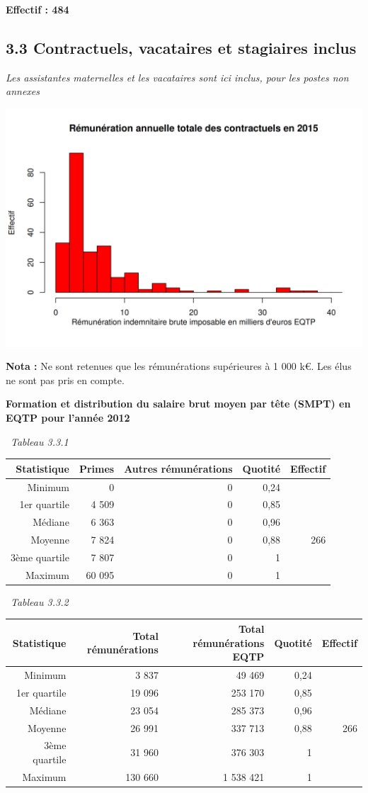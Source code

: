 \textbf{Effectif : 484 }

\hypertarget{contractuels-vacataires-et-stagiaires-inclus-1}{%
\subsection{3.3 Contractuels, vacataires et stagiaires
inclus}\label{contractuels-vacataires-et-stagiaires-inclus-1}}

\emph{Les assistantes maternelles et les vacataires sont ici inclus,
pour les postes non annexes}

\includegraphics{altair_files/figure-latex/unnamed-chunk-94-1.png}

\textbf{Nota :} Ne sont retenues que les rémunérations supérieures à 1
000 k€. Les élus ne sont pas pris en compte.

\textbf{Formation et distribution du salaire brut moyen par tête (SMPT)
en EQTP pour l'année 2012 }

~\emph{Tableau 3.3.1}

\begin{longtable}[]{@{}rrrrr@{}}
\toprule
Statistique & Primes & Autres rémunérations & Quotité &
Effectif\tabularnewline
\midrule
\endhead
Minimum & 0 & 0 & 0,24 &\tabularnewline
1er quartile & 4 509 & 0 & 0,85 &\tabularnewline
Médiane & 6 363 & 0 & 0,96 &\tabularnewline
Moyenne & 7 824 & 0 & 0,88 & 266\tabularnewline
3ème quartile & 7 807 & 0 & 1 &\tabularnewline
Maximum & 60 095 & 0 & 1 &\tabularnewline
\bottomrule
\end{longtable}

~\emph{Tableau 3.3.2}

\begin{longtable}[]{@{}rrrrr@{}}
\toprule
Statistique & Total rémunérations & Total rémunérations EQTP & Quotité &
Effectif\tabularnewline
\midrule
\endhead
Minimum & 3 837 & 49 469 & 0,24 &\tabularnewline
1er quartile & 19 096 & 253 170 & 0,85 &\tabularnewline
Médiane & 23 054 & 285 373 & 0,96 &\tabularnewline
Moyenne & 26 991 & 337 713 & 0,88 & 266\tabularnewline
3ème quartile & 31 960 & 376 303 & 1 &\tabularnewline
Maximum & 130 660 & 1 538 421 & 1 &\tabularnewline
\bottomrule
\end{longtable}

